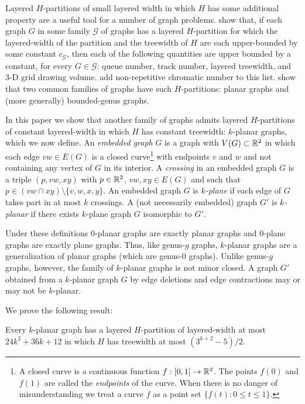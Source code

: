 \documentclass{patmorin}
\begin{document}
Layered $H$-partitions of small layered width in which $H$ has some additional property are a useful tool for a number of graph problems. \citet{dujmovic.joret.ea:planar} show that, if each graph $G$ in some family $\mathcal{G}$ of graphs has a layered $H$-partition for which the layered-width of the partition and the treewidth of $H$ are each upper-bounded by some constant $c_\mathcal{G}$, then each of the following quantities are upper bounded by a constant, for every $G\in\mathcal{G}$: queue number, track number, layered treewidth, and 3-D grid drawing volume. \citet{dujmovic.esperet.ea:planar} add non-repetitive chromatic number to this list.  \citet{dujmovic.joret.ea:planar} show that two common families of graphs have such $H$-partitions: planar graphs and (more generally) bounded-genus graphs.

In this paper we show that another family of graphs admits layered $H$-partitions of constant layered-width in which $H$ has constant treewidth: $k$-planar graphs, which we now define. An \emph{embedded graph} $G$ is a graph with $V(G)\subset\mathbb{R}^2$ in which each edge $vw\in E(G)$ is a closed curve\footnote{A closed curve is a continuous function $f:[0,1]\to \mathbb{R}^2$. The points $f(0)$ and $f(1)$ are called the \emph{endpoints} of the curve.  When there is no danger of misunderstanding we treat a curve $f$ as a point set $\{f(t):0\le t\le 1\}$.} with endpoints $v$ and $w$ and not containing any vertex of $G$ in its interior.  A \emph{crossing} in an embedded graph $G$ is a triple $(p,vw,xy)$ with $p\in\mathbb{R}^2$, $vw,xy\in E(G)$ and such that $p\in (vw\cap xy)\setminus\{v,w,x,y\}$. An embedded graph $G$ is \emph{$k$-plane} if each edge of $G$ takes part in at most $k$ crossings.  A (not necessarily embedded) graph $G'$ is \emph{$k$-planar} if there exists $k$-plane graph $G$ isomorphic to $G'$.  

Under these definitions $0$-planar graphs are exactly planar graphs and $0$-plane graphs are exactly plane graphs. Thus, like genus-$g$ graphs, $k$-planar graphs are a generalization of planar graphs (which are genus-$0$ graphs).  Unlike genus-$g$ graphs, however, the family of $k$-planar graphs is not minor closed. A graph $G'$ obtained from a $k$-planar graph $G$ by edge deletions and edge contractions may or may not be $k$-planar.

We prove the following result:
\begin{thm}
  Every $k$-planar graph has a layered $H$-partition of layered-width at most $24k^2 + 36k + 12$ in which $H$ has treewidth at most $(3^{k+2}-5)/2$.
\end{thm}
\end{document}

